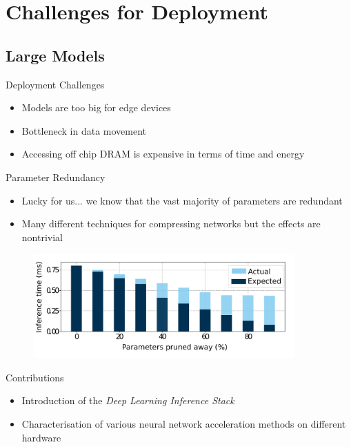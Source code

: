 \documentclass[xcolor=dvipsnames]{beamer}
\begin{document}
\section{Challenges for Deployment}

\subsection{Large Models}

\begin{frame}{Deployment Challenges}

\begin{itemize}
	\item Models are too big for edge devices 
    \item Bottleneck in data movement
    \item Accessing off chip DRAM is expensive in terms of time and energy
\end{itemize}

\end{frame}

\begin{frame}{Parameter Redundancy}



\begin{itemize}
	\item Lucky for us... we know that the vast majority of parameters are redundant 
    \item Many different techniques for compressing networks but the effects are nontrivial
\end{itemize}

\begin{figure}
    \centering
    \includegraphics[width=10cm]{images/speedup.pdf}
\end{figure}



\end{frame}


\begin{frame}{Contributions}
    
    \begin{itemize}
        \item Introduction of the \textit{Deep Learning Inference Stack}
        \item Characterisation of various neural network acceleration methods on different hardware
    \end{itemize}
    
\end{frame}
\end{document}
